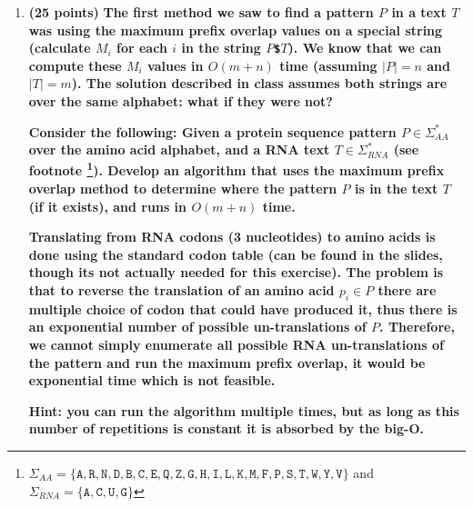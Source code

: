 \documentclass[11pt, oneside]{article}   	%
\begin{document}
\begin{enumerate}
\item \textbf{(25 points)} 
\textbf{The first method we saw to find a pattern $P$ in a text $T$ was using the maximum prefix overlap values on a special string (calculate $M_i$ for each $i$ in the string $P$\texttt{\$}$T$).
We know that we can compute these $M_i$ values in $O(m+n)$ time (assuming $|P|=n$ and $|T|=m$).
The solution described in class assumes both strings are over the same alphabet: what if they were not?}

\textbf{Consider the following:
Given a protein sequence pattern $P\in\Sigma_{AA}^*$ over the amino acid alphabet, and a RNA text $T\in\Sigma_{RNA}^*$ 
(see footnote 
\footnote{$\Sigma_{AA} = \{\texttt{A},\texttt{R},\texttt{N},\texttt{D},\texttt{B},\texttt{C},\texttt{E},\texttt{Q},\texttt{Z},\texttt{G},\texttt{H},\texttt{I},\texttt{L},\texttt{K},\texttt{M},\texttt{F},\texttt{P},\texttt{S},\texttt{T},\texttt{W},\texttt{Y},\texttt{V}\}$ and $\Sigma_{RNA} = \{\texttt{A},\texttt{C},\texttt{U},\texttt{G}\}$}). 
Develop an algorithm that uses the maximum prefix overlap method to determine where the pattern $P$ is in the text $T$ (if it exists),
and runs in $O(m+n)$ time. }

\textbf{Translating from RNA codons (3 nucleotides) to amino acids is done using the standard codon table (can be found in the slides, though its not actually needed for this exercise). 
The problem is that to reverse the translation of an amino acid $p_i \in P$ there are multiple choice of codon that could have produced it, 
thus there is an exponential number of possible un-translations of $P$.
Therefore, we cannot simply enumerate all possible RNA un-translations of the pattern and run the maximum prefix overlap, it would be exponential time which is not feasible.}

\textbf{Hint: you can run the algorithm multiple times, but as long as this number of repetitions is constant it is absorbed by the big-O.}



\end{enumerate}
\end{document}
